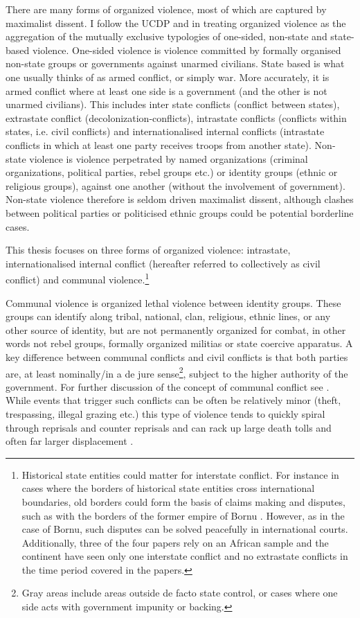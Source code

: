 \documentclass[12pt]{article}
\begin{document}
There are many forms of organized violence, most of which are captured by
maximalist dissent. I follow the UCDP and \citet{Melander_2016} in treating
organized violence as the aggregation of the mutually exclusive typologies of
one-sided, non-state and state-based violence. One-sided violence is violence
committed by formally organised non-state groups or governments against unarmed
civilians. State based is what one usually thinks of as armed conflict, or
simply war. More accurately, it is armed conflict where at least one side is a
government (and the other is not unarmed civilians). This includes inter state
conflicts (conflict between states), extrastate conflict
(decolonization-conflicts), intrastate conflicts (conflicts within states, i.e.
civil conflicts) and internationalised internal conflicts (intrastate conflicts
in which at least one party receives troops from another state). Non-state
violence is violence perpetrated by named organizations (criminal organizations,
political parties, rebel groups etc.) or identity groups (ethnic or religious
groups), against one another (without the involvement of government). Non-state
violence therefore is seldom driven maximalist dissent, although clashes between
political parties or politicised ethnic groups could be potential borderline
cases.

This thesis focuses on three forms of organized violence: intrastate,
internationalised internal conflict (hereafter referred to collectively as civil
conflict) and communal violence.\footnote{Historical state entities could matter
	for interstate conflict. For instance in cases where the borders of
	historical state entities cross international boundaries, old borders
	could form the basis of claims making and disputes, such as with the
	borders of the former empire of Bornu \citep{Hariri2012}. However, as in
	the case of Bornu, such disputes can be solved peacefully in
	international courts. Additionally, three of the four papers rely on an
	African sample and the continent have seen only one interstate conflict
and no extrastate conflicts in the time period covered in the papers.} 

Communal violence is organized lethal violence between identity groups. These
groups can identify along tribal, national, clan, religious, ethnic lines, or
any other source of identity, but are not permanently organized for combat, in
other words not rebel groups, formally organized militias or state coercive
apparatus. A key difference between communal conflicts and civil conflicts is
that both parties are, at least nominally/in a de jure sense\footnote{Gray
        areas include areas outside de facto state control, or cases where one
side acts with government impunity or backing.}, subject to the higher
authority of the government. For further discussion of the concept of communal
conflict see \citet{BroscheJohan2012Cccw}. While events that trigger such
conflicts can be often be relatively minor (theft, trespassing, illegal
grazing etc.) this type of violence tends to quickly spiral through reprisals
and counter reprisals and can rack up large death tolls and often far larger
displacement \citep{Horowitz_2001}. 
\end{document}

